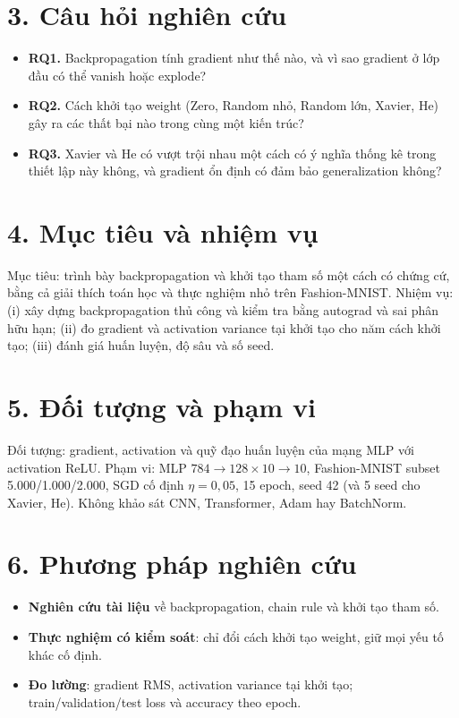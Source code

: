 \documentclass[12pt,a4paper]{report}
\begin{document}
\section*{3. Câu hỏi nghiên cứu}
\begin{itemize}
  \item \textbf{RQ1.} Backpropagation tính gradient như thế nào, và vì sao gradient ở lớp đầu có thể vanish hoặc explode?
  \item \textbf{RQ2.} Cách khởi tạo weight (Zero, Random nhỏ, Random lớn, Xavier, He) gây ra các thất bại nào trong cùng một kiến trúc?
  \item \textbf{RQ3.} Xavier và He có vượt trội nhau một cách có ý nghĩa thống kê trong thiết lập này không, và gradient ổn định có đảm bảo generalization không?
\end{itemize}

\section*{4. Mục tiêu và nhiệm vụ}
Mục tiêu: trình bày backpropagation và khởi tạo tham số một cách có chứng cứ, bằng cả giải thích toán học và thực nghiệm nhỏ trên Fashion-MNIST. Nhiệm vụ: (i) xây dựng backpropagation thủ công và kiểm tra bằng autograd và sai phân hữu hạn; (ii) đo gradient và activation variance tại khởi tạo cho năm cách khởi tạo; (iii) đánh giá huấn luyện, độ sâu và số seed.

\section*{5. Đối tượng và phạm vi}
Đối tượng: gradient, activation và quỹ đạo huấn luyện của mạng MLP với activation ReLU. Phạm vi: MLP $784\to128\times10\to10$, Fashion-MNIST subset 5.000/1.000/2.000, SGD cố định $\eta=0{,}05$, 15 epoch, seed 42 (và 5 seed cho Xavier, He). Không khảo sát CNN, Transformer, Adam hay BatchNorm.

\section*{6. Phương pháp nghiên cứu}
\begin{itemize}
  \item \textbf{Nghiên cứu tài liệu} về backpropagation, chain rule và khởi tạo tham số.
  \item \textbf{Thực nghiệm có kiểm soát}: chỉ đổi cách khởi tạo weight, giữ mọi yếu tố khác cố định.
  \item \textbf{Đo lường}: gradient RMS, activation variance tại khởi tạo; train/validation/test loss và accuracy theo epoch.
\end{itemize}
\end{document}

